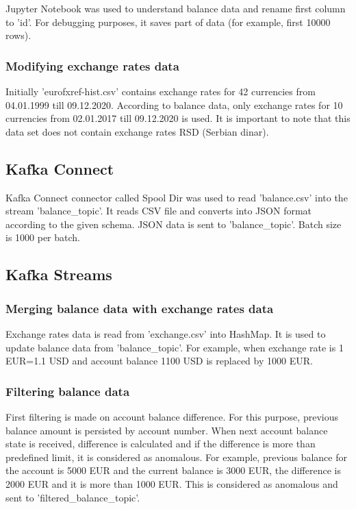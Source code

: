 \documentclass{article}
\begin{document}
Jupyter Notebook was used to understand balance data and rename first column to 'id'. For debugging purposes, it saves part of data (for example, first 10000 rows).

\subsubsection{Modifying exchange rates data}

Initially 'eurofxref-hist.csv' contains exchange rates for 42 currencies from 04.01.1999 till 09.12.2020. According to balance data, only exchange rates for 10 currencies from 02.01.2017 till 09.12.2020 is used. It is important to note that this data set does not contain exchange rates RSD (Serbian dinar).

\subsection{Kafka Connect}

Kafka Connect connector called Spool Dir was used to read 'balance.csv' into the stream 'balance\_topic'. It reads CSV file and converts into JSON format according to the given schema. JSON data is sent to 'balance\_topic'. Batch size is 1000 per batch.

\subsection{Kafka Streams}

\subsubsection{Merging balance data with exchange rates data}

Exchange rates data is read from 'exchange.csv' into HashMap. It is used to update balance data from 'balance\_topic'. For example, when exchange rate is 1 EUR=1.1 USD and account balance 1100 USD is replaced by 1000 EUR.

\subsubsection{Filtering balance data}

First filtering is made on account balance difference. For this purpose, previous balance amount is persisted by account number. When next account balance state is received, difference is calculated and if the difference is more than predefined limit, it is considered as anomalous. For example, previous balance for the account is 5000 EUR and the current balance is 3000 EUR, the difference is 2000 EUR and it is more than 1000 EUR. This is considered as anomalous and sent to 'filtered\_balance\_topic'.
\end{document}
